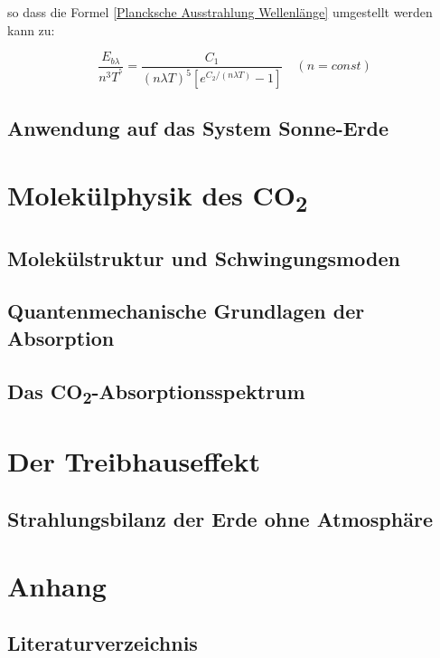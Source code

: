 \documentclass[12pt,a4paper]{article}
\begin{document}
so dass die Formel \eqref{Plancksche Ausstrahlung Wellenlänge} umgestellt werden kann zu:

\begin{equation}
  \frac{E_{b\lambda}}{n^3T^^5} = \frac{C_1}{(n\lambda T)^5[e^{C_2/(n\lambda T)}-1]} \quad (n = const)
\end{equation}



\subsection{Anwendung auf das System Sonne-Erde}

\section{Molekülphysik des CO\textsubscript{2}}

\subsection{Molekülstruktur und Schwingungsmoden}

\subsection{Quantenmechanische Grundlagen der Absorption}

\subsection{Das CO\textsubscript{2}-Absorptionsspektrum}

\section{Der Treibhauseffekt}

\subsection{Strahlungsbilanz der Erde ohne Atmosphäre}

\newpage
\section{Anhang}

\subsection{Literaturverzeichnis}
\printbibliography[heading=none]

\end{document}
